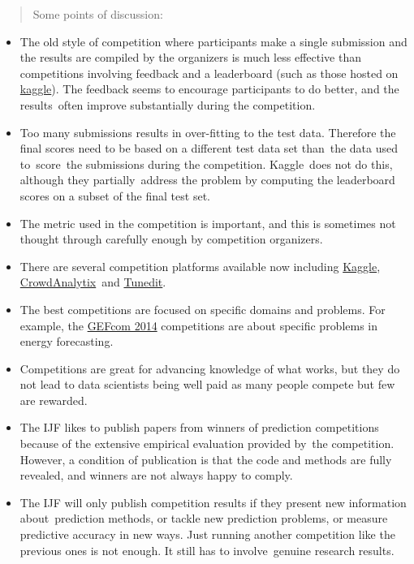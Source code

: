 \documentclass[11pt,a4paper,]{article}
\begin{document}
\begin{quote}
Some points of discussion:
\end{quote}

\begin{itemize}
\item
  The old style of competition where participants make a single submission and the results are compiled by the organizers is much less effective than competitions involving feedback and a leaderboard (such as those hosted on \href{http://www.kaggle.com}{kaggle}). The feedback seems to encourage participants to do better, and the results~often improve substantially during the competition.
\item
  Too many submissions results in over-fitting to the test data. Therefore the final scores need to be based on a different test data set than~the data used to~score~the submissions during the competition. Kaggle~does not do this, although they partially~address the problem by computing the leaderboard scores on a subset of the final test set.
\item
  The metric used in the competition is important, and this is sometimes not thought through carefully enough by competition organizers.
\item
  There are several competition platforms available now including \href{http://kaggle.com}{Kaggle}, \href{http://crowdanalytix.com}{CrowdAnalytix}~and \href{http://tunedit.org/}{Tunedit}.
\item
  The best competitions are focused on specific domains and problems. For example, the \href{http://www.gefcom.org}{GEFcom 2014} competitions are about specific problems in energy forecasting.
\item
  Competitions are great for advancing knowledge of what works, but they do not lead to data scientists being well paid as many people compete but few are rewarded.
\item
  The IJF likes to publish papers from winners of prediction competitions because of the extensive empirical evaluation provided by~the competition. However, a condition of publication is that the code and methods are fully revealed, and winners are not always happy to comply.
\item
  The IJF will only publish competition results if they present new information about~prediction methods, or tackle new prediction problems, or measure predictive accuracy in new ways. Just running another competition like the previous ones is not enough. It still has to involve~genuine research results.

\end{itemize}
\end{document}
